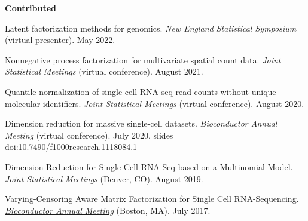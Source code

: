 \documentclass[10pt]{article}
\newcommand\doilink[1]{\href{https://dx.doi.org/#1}{#1}}
\newcommand\doi[1]{doi:\doilink{#1}}
\begin{document}
\textbf{Contributed}
\begin{enumerate}[label= {[\arabic*]}]
\item Latent factorization methods for genomics. {\it New England Statistical Symposium} (virtual presenter). May 2022.
\item Nonnegative process factorization for multivariate spatial count data. {\it Joint Statistical Meetings} (virtual conference). August 2021.
\item Quantile normalization of single-cell RNA-seq read counts without unique molecular identifiers. {\it Joint Statistical Meetings} (virtual conference). August 2020.
\item Dimension reduction for massive single-cell datasets. {\it Bioconductor Annual Meeting} (virtual conference). July 2020. slides \doi{10.7490/f1000research.1118084.1}
\item Dimension Reduction for Single Cell RNA-Seq based on a Multinomial Model. {\it Joint Statistical Meetings} (Denver, CO). August 2019.
\item Varying-Censoring Aware Matrix Factorization for Single Cell RNA-Sequencing. \href{https://www.bioconductor.org/help/course-materials/2017/BioC2017/}{{\it Bioconductor Annual Meeting}} (Boston, MA). July 2017.
\end{enumerate}
\end{document}
